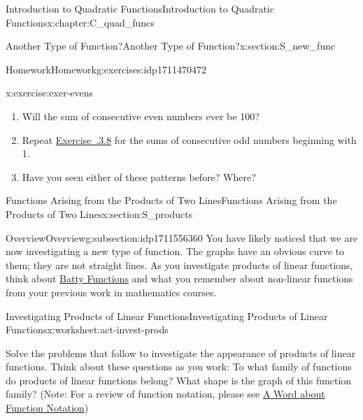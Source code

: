 \documentclass[oneside,10pt,]{book}
\newcommand{\xreffont}{\relax}
\numberwithin{equation}{chapter}
\begin{document}
\begin{chapterptx}{Introduction to Quadratic Functions}{}{Introduction to Quadratic Functions}{}{}{x:chapter:C_quad_funcs}
\begin{sectionptx}{Another Type of Function?}{}{Another Type of Function?}{}{}{x:section:S_new_func}
\begin{exercises-subsection}{Homework}{}{Homework}{}{}{g:exercises:idp1711470472}
\begin{divisionexercise}{8}{}{}{x:exercise:exer-evens}
\begin{enumerate}[font=\bfseries,label=(\alph*),ref=\alph*]
\item{}Will the sum of consecutive even numbers ever be 100?%
\item{}Repeat \hyperlink{x:exercise:exer-evens}{Exercise~{\xreffont 4.1.3.8}} for the sums of consecutive odd numbers beginning with 1.%
\item{}Have you seen either of these patterns before? Where?%
\end{enumerate}
\end{divisionexercise}%
\end{exercises-subsection}
\end{sectionptx}
%
%
\typeout{************************************************}
\typeout{************************************************}
%
\begin{sectionptx}{Functions Arising from the Products of Two Lines}{}{Functions Arising from the Products of Two Lines}{}{}{x:section:S_products}
%
%
\typeout{************************************************}
\typeout{************************************************}
%
\begin{subsectionptx}{Overview}{}{Overview}{}{}{g:subsection:idp1711556360}
You have likely noticed that we are now investigating a new type of function. The graphs have an obvious curve to them; they are not straight lines. As you investigate products of linear functions, think about \hyperref[x:worksheet:act-batty-func]{Batty Functions} and what you remember about non-linear functions from your previous work in mathematics courses.%
\end{subsectionptx}
%
%
\typeout{************************************************}
\typeout{************************************************}
%
\begin{worksheet-subsection}{Investigating Products of Linear Functions}{}{Investigating Products of Linear Functions}{}{}{x:worksheet:act-invest-prods}
\begin{introduction}{}%
Solve the problems that follow to investigate the appearance of products of linear functions. Think about these questions as you work: To what family of functions do products of linear functions belong? What shape is the graph of this function family? (Note: For a review of function notation, please see \hyperlink{x:paragraphs:function-notation}{A Word about Function Notation})%

\end{introduction}
\end{worksheet-subsection}
\end{sectionptx}
\end{chapterptx}
\end{document}
